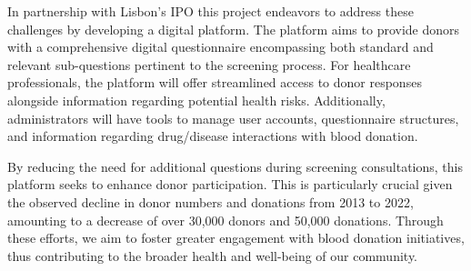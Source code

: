 In partnership with Lisbon's IPO this project endeavors to address these challenges by developing a digital platform. The platform aims to provide donors with a comprehensive digital questionnaire encompassing both standard and relevant sub-questions pertinent to the screening process. For healthcare professionals, the platform will offer streamlined access to donor responses alongside information regarding potential health risks. Additionally, administrators will have tools to manage user accounts, questionnaire structures, and information regarding drug/disease interactions with blood donation.

By reducing the need for additional questions during screening consultations, this platform seeks to enhance donor participation. This is particularly crucial given the observed decline in donor numbers and donations from 2013 to 2022, amounting to a decrease of over 30,000 donors and 50,000 donations. Through these efforts, we aim to foster greater engagement with blood donation initiatives, thus contributing to the broader health and well-being of our community.

